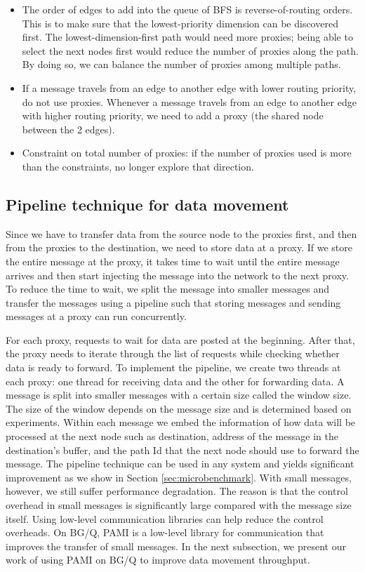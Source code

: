 \documentclass[final,5p,times]{elsarticle}
\begin{document}
\begin{itemize}
\item The order of edges to add into the queue of BFS is reverse-of-routing orders. This is to make sure that the lowest-priority dimension can be discovered first. The lowest-dimension-first path would need more proxies; being able to select the next nodes first would reduce the number of proxies along the path. By doing so, we can balance the number of proxies among multiple paths.
\item If a message travels from an edge to another edge with lower routing priority, do not use proxies. Whenever a message travels from an edge to another edge with higher routing priority, we need to add a proxy (the shared node between the 2 edges).
\item Constraint on total number of proxies: if the number of proxies used is more than the constraints, no longer explore that direction.
\end{itemize}

\subsection{Pipeline technique for data movement}
Since we have to transfer data from the source node to the proxies first, and then from the proxies to the destination, we need to store data at a proxy. If we store the entire message at the proxy, it takes time to wait until the entire message arrives and  then start injecting the message into the network to the next proxy. To reduce the time to wait, we split the message into smaller messages and transfer the messages using a pipeline such that storing messages and sending messages at a proxy can run concurrently.

For each proxy, requests to wait for data are posted at the beginning. After that, the proxy needs to iterate through the list of requests while checking whether data is ready to forward. To implement the pipeline, we create two threads at each proxy: one thread for receiving data and the other for forwarding data. A message is split into smaller messages with a certain size called the window size. The size of the window depends on the message size and is determined based on experiments. Within each message we embed the information of how data will be processed at the next node such as destination, address of the message in the destination's buffer, and the path Id that the next node should use to forward the message. The pipeline technique can be used in any system and yields significant improvement as we show in Section \ref{sec:microbenchmark}. With small messages, however, we still suffer performance degradation. The reason is that the control overhead in small messages is significantly large compared with the message size itself. Using low-level communication libraries can help reduce the control overheads. On BG/Q, PAMI is a low-level library for communication that improves the transfer of small messages. In the next subsection, we present our work of using PAMI on BG/Q to improve data movement throughput.
\end{document}
